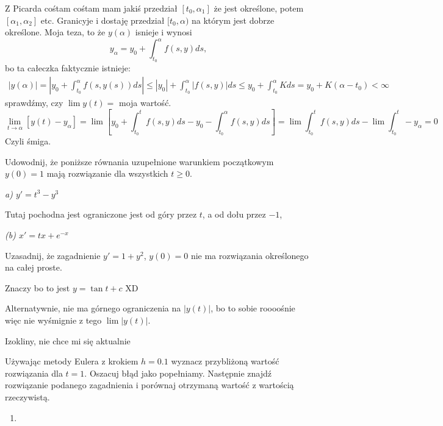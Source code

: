 \documentclass{article}
\begin{document}
Z Picarda cośtam cośtam mam jakiś przedział $[t_0, \alpha_1]$ że jest określone, potem $[\alpha_1,\alpha_2]$ etc. Granicyje i dostaję przedział $[t_0,\alpha)$ na którym jest dobrze określone. Moja teza, to że $y(\alpha)$ isnieje i wynosi
$$y_\alpha=y_0+\int_{t_0}^\alpha f(s,y)ds,$$
bo ta całeczka faktycznie istnieje:
\begin{align*}
    |y(\alpha)|=\left|y_0+\int_{t_0}^\alpha f(s, y(s))ds\right|\leq |y_0|+\int_{t_0}^\alpha|f(s,y)|ds\leq y_0+\int_{t_0}^\alpha Kds=y_0+K(\alpha-t_0)<\infty
\end{align*}
sprawdźmy, czy $\lim y(t)=$ moja wartość.
$$\lim_{t\to\alpha}\left[y(t)-y_\alpha\right]=\lim\left[y_0+\int_{t_0}^tf(s,y)ds-y_0-\int_{t_0}^\alpha f(s, y)ds\right]=\lim\int_{t_0}^t f(s,y)ds-\lim\int_{t_0}^t-y_\alpha=0$$
Czyli śmiga.

\begin{problem}{}
Udowodnij, że poniższe równania uzupełnione warunkiem początkowym $y(0)=1$ mają rozwiązanie dla wszystkich $t\geq0$.
\end{problem}

\emph{\color{green}a) $y'=t^3-y^3$}

Tutaj pochodna jest ograniczone jest od góry przez $t$, a od dołu przez $-1$,



\emph{\color{green}(b) $x'=tx+e^{-x}$}

\begin{problem}{}
Uzasadnij, że zagadnienie $y'=1+y^2$, $y(0)=0$ nie ma rozwiązania określonego na całej proste.
\end{problem}

Znaczy bo to jest $y=\tan{t+c}$ XD

Alternatywnie, nie ma górnego ograniczenia na $|y(t)|$, bo to sobie roooośnie więc nie wyśmignie z tego $\lim|y(t)|$.

\begin{problem}[4]{}
Izokliny, nie chce mi się aktualnie
\end{problem}

\begin{problem}[5]{}
Używając metody Eulera z krokiem $h=0.1$ wyznacz przybliżoną wartość rozwiązania dla $t=1$. Oszacuj błąd jako popełniamy. Następnie znajdź rozwiązanie podanego zagadnienia i porównaj otrzymaną wartość z wartością rzeczywistą.
\end{problem}

\begin{enumerate}[label=(\alph*)]
    \item 
\end{enumerate}
\end{document}
